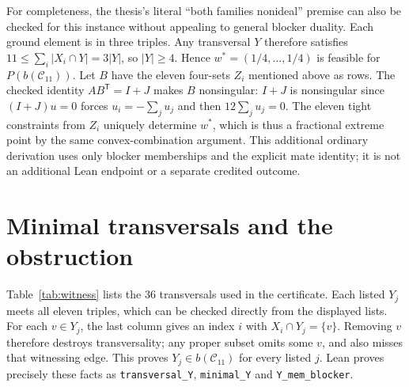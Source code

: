\documentclass[11pt]{article}
\newcommand{\C}{\mathcal C}
\begin{document}
For completeness, the thesis's literal ``both families nonideal'' premise can also be checked for this instance without appealing to general blocker duality. Each ground element is in three triples. Any transversal $Y$ therefore satisfies $11\leq\sum_i|X_i\cap Y|=3|Y|$, so $|Y|\geq4$. Hence $w^*=(1/4,\ldots,1/4)$ is feasible for $P(b(\C_{11}))$. Let $B$ have the eleven four-sets $Z_i$ mentioned above as rows. The checked identity $AB^{\mathsf T}=I+J$ makes $B$ nonsingular: $I+J$ is nonsingular since $(I+J)u=0$ forces $u_i=-\sum_j u_j$ and then $12\sum_j u_j=0$. The eleven tight constraints from $Z_i$ uniquely determine $w^*$, which is thus a fractional extreme point by the same convex-combination argument. This additional ordinary derivation uses only blocker memberships and the explicit mate identity; it is not an additional Lean endpoint or a separate credited outcome.

\section{Minimal transversals and the obstruction}
Table~\ref{tab:witness} lists the 36 transversals used in the certificate. Each listed $Y_j$ meets all eleven triples, which can be checked directly from the displayed lists. For each $v\in Y_j$, the last column gives an index $i$ with $X_i\cap Y_j=\{v\}$. Removing $v$ therefore destroys transversality; any proper subset omits some $v$, and also misses that witnessing edge. This proves $Y_j\in b(\C_{11})$ for every listed $j$. Lean proves precisely these facts as \texttt{transversal\_Y}, \texttt{minimal\_Y} and \texttt{Y\_mem\_blocker}.
\end{document}
